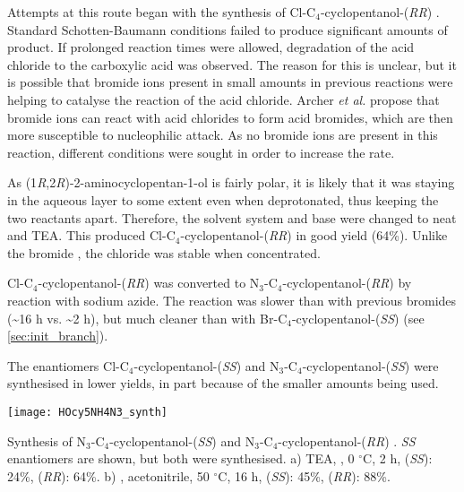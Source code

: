 Attempts at this route began with the synthesis of Cl-C$_4$-cyclopentanol-(\textit{RR}) . Standard Schotten-Baumann conditions failed to produce significant amounts of product. If prolonged reaction times were allowed, degradation of the acid chloride to the carboxylic acid was observed. The reason for this is unclear, but it is possible that bromide ions present in small amounts in previous reactions were helping to catalyse the reaction of the acid chloride. Archer \textit{et al.}\cite{Archer1953} propose that bromide ions can react with acid chlorides to form acid bromides, which are then more susceptible to nucleophilic attack.
As no bromide ions are present in this reaction, different conditions were sought in order to increase the rate.

As (1\textit{R},2\textit{R})-2-aminocyclopentan-1-ol  is fairly polar, it is likely that it was staying in the aqueous layer to some extent even when deprotonated, thus keeping the two reactants apart.
Therefore, the solvent system and base were changed to neat  and TEA.
This produced Cl-C$_4$-cyclopentanol-(\textit{RR})  in good yield (64\%). Unlike the bromide , the chloride  was stable when concentrated.

Cl-C$_4$-cyclopentanol-(\textit{RR})  was converted to N$_3$-C$_4$-cyclopentanol-(\textit{RR})  by reaction with sodium azide. The reaction was slower than with previous bromides (\textasciitilde16 h vs. \textasciitilde2 h), but much cleaner than with Br-C$_4$-cyclopentanol-(\textit{SS})  (see \ref{sec:init_branch}).

The enantiomers Cl-C$_4$-cyclopentanol-(\textit{SS})  and N$_3$-C$_4$-cyclopentanol-(\textit{SS})  were synthesised in lower yields, in part because of the smaller amounts being used.

\begin{scheme}[H]
	\begin{center}
		\texttt{[image: HOcy5NH4N3\_synth]}
		\caption{Synthesis of N$_3$-C$_4$-cyclopentanol-(\textit{SS})  and N$_3$-C$_4$-cyclopentanol-(\textit{RR}) . 
		\textit{SS} enantiomers are shown, but both were synthesised.
		a) TEA, , 0 $^{\circ}$C, 2 h,
		 (\textit{SS}): 24\%, 
		 (\textit{RR}): 64\%.
		b) , acetonitrile, 50 $^\circ$C, 16 h, 
		 (\textit{SS}): 45\%, 
		 (\textit{RR}): 88\%.
		\label{sch:HOcy5NH4N3_synth}}
	\end{center}
\end{scheme}

